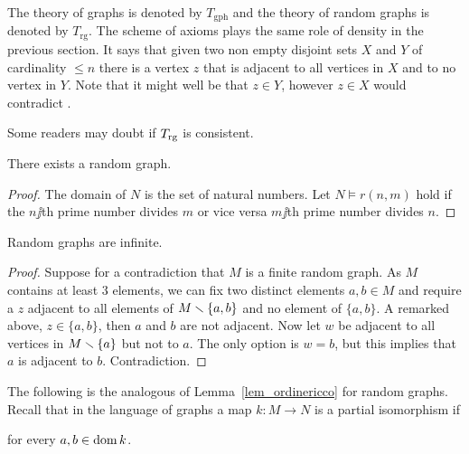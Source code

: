 \documentclass[creche.tex]{subfiles}
\begin{document}
The theory of graphs is denoted by \emph{$T_{\textrm{gph}}$} and the theory of random graphs is denoted by \emph{$T_{\textrm{rg}}$}. The scheme of axioms  plays the same role of density in the previous section.  It says that given two non empty disjoint sets $X$ and $Y$ of cardinality $\le n$ there is a vertex $z$ that is adjacent to all vertices in $X$ and to no vertex in $Y$. Note that it might well be that $z\in Y$, however $z\in X$ would contradict .

Some readers may doubt if $T_{\rm rg}$ is consistent.

\begin{proposition}
There exists a random graph.
\end{proposition}
\begin{proof}
The domain of $N$ is the set of natural numbers. Let $N\models r(n,m)$ hold if the $n\jj$th prime number divides $m$ or vice versa $m\jj$th prime number divides $n$.
\end{proof}



\begin{proposition}
Random graphs are infinite.
\end{proposition}
\begin{proof}
Suppose for a contradiction that $M$ is a finite random graph. As $M$ contains at least $3$ elements, we can fix two distinct elements $a,b\in M$ and require a $z$ adjacent to all elements of $M\smallsetminus\{a,b\}$ and no element of $\{a,b\}$. A remarked above, $z\in\{a,b\}$, then $a$ and $b$ are not adjacent. Now let $w$ be adjacent to all vertices in $M\smallsetminus\{a\}$ but not to $a$. The only option is $w=b$, but this implies that $a$ is adjacent to $b$. Contradiction.
\end{proof}

The following is the analogous of Lemma~\ref{lem_ordinericco} for random graphs. Recall that in the language of graphs a map $k:M\to N$ is a partial isomorphism if

\hfill for every $a,b\in\mathop{\rm dom} k$.
\end{document}
